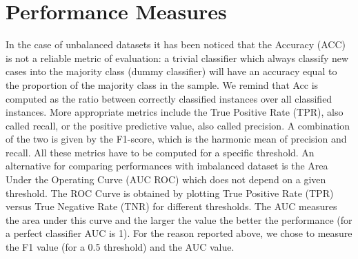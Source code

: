 \documentclass{article}
\begin{document}
\section{Performance Measures}
\label{sec:performance_measures}
In the case of unbalanced datasets it has been noticed that the Accuracy (ACC) is not a reliable metric of evaluation: a trivial classifier which always classify new cases into the majority class (dummy classifier) will have an accuracy equal to the proportion of the majority class in the sample. We remind that Acc is computed as the ratio between correctly classified instances over all classified instances. More appropriate metrics include the True Positive Rate (TPR), also called recall, or the positive predictive value, also called precision. A combination of the two is given by the F1-score, which is the harmonic mean of precision and recall. All these metrics have to be computed for a specific threshold.
An alternative for comparing performances with imbalanced dataset is the Area Under the Operating Curve (AUC ROC) which does not depend on a given threshold. The ROC Curve is obtained by plotting True Positive Rate (TPR) versus True Negative Rate (TNR) for different thresholds. The AUC measures the area under this curve and the larger the value the better the performance (for a perfect classifier AUC is 1). For the reason reported above, we chose to measure the F1 value (for a 0.5 threshold) and the AUC value.
\end{document}
